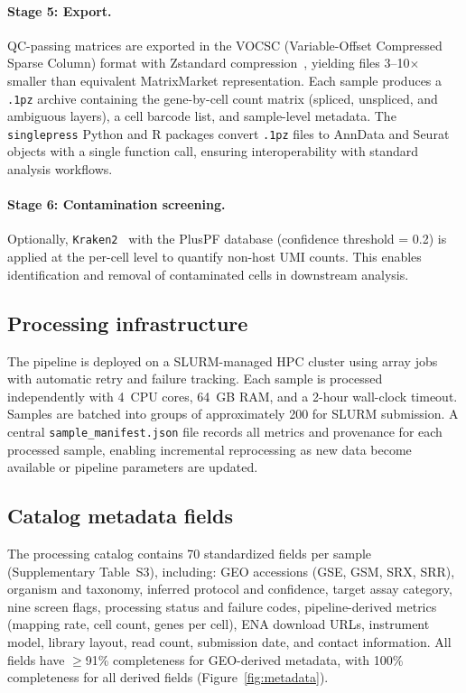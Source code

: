 \documentclass[10pt,twocolumn,letterpaper]{article}
\begin{document}
\paragraph{Stage 5: Export.} QC-passing matrices are exported in the VOCSC
(Variable-Offset Compressed Sparse Column) format with Zstandard
compression~\citep{vocsc2024}, yielding files 3--10$\times$ smaller than
equivalent MatrixMarket representation. Each sample produces a \texttt{.1pz}
archive containing the gene-by-cell count matrix (spliced, unspliced, and
ambiguous layers), a cell barcode list, and sample-level metadata.
The \texttt{singlepress} Python and R packages convert \texttt{.1pz}
files to AnnData and Seurat objects with a single function call,
ensuring interoperability with standard analysis workflows.

\paragraph{Stage 6: Contamination screening.} Optionally,
\texttt{Kraken2}~\citep{wood2019} with the PlusPF database
(confidence threshold = 0.2) is applied at the per-cell level to quantify
non-host UMI counts. This enables identification and removal of
contaminated cells in downstream analysis.

\subsection{Processing infrastructure}

The pipeline is deployed on a SLURM-managed HPC cluster using array jobs
with automatic retry and failure tracking. Each sample is processed
independently with 4~CPU cores, 64~GB RAM, and a 2-hour wall-clock timeout.
Samples are batched into groups of approximately 200 for SLURM submission.
A central \texttt{sample\_manifest.json} file records all metrics and
provenance for each processed sample, enabling incremental reprocessing
as new data become available or pipeline parameters are updated.

\subsection{Catalog metadata fields}

The processing catalog contains 70 standardized fields per sample
(Supplementary Table~S3), including: GEO accessions (GSE, GSM, SRX, SRR),
organism and taxonomy, inferred protocol and confidence, target assay
category, nine screen flags, processing status and failure codes,
pipeline-derived metrics (mapping rate, cell count, genes per cell), ENA
download URLs, instrument model, library layout, read count, submission
date, and contact information. All fields have $\geq$91\% completeness
for GEO-derived metadata, with 100\% completeness for all derived fields
(Figure~\ref{fig:metadata}).
\end{document}
